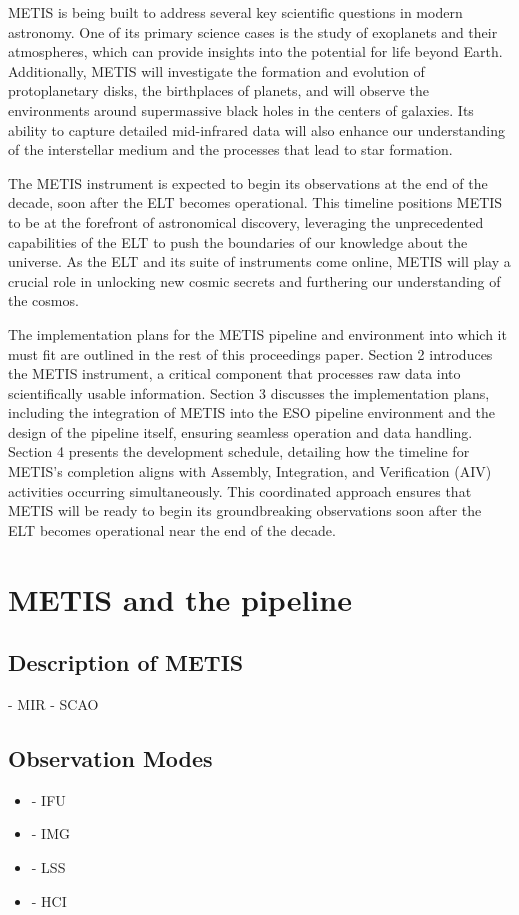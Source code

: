 \documentclass[a4paper]{spie}  %
\begin{document}
METIS is being built to address several key scientific questions in modern astronomy. One of its primary science cases is the study of exoplanets and their atmospheres, which can provide insights into the potential for life beyond Earth. Additionally, METIS will investigate the formation and evolution of protoplanetary disks, the birthplaces of planets, and will observe the environments around supermassive black holes in the centers of galaxies. Its ability to capture detailed mid-infrared data will also enhance our understanding of the interstellar medium and the processes that lead to star formation.

The METIS instrument is expected to begin its observations at the end of the decade, soon after the ELT becomes operational. This timeline positions METIS to be at the forefront of astronomical discovery, leveraging the unprecedented capabilities of the ELT to push the boundaries of our knowledge about the universe. As the ELT and its suite of instruments come online, METIS will play a crucial role in unlocking new cosmic secrets and furthering our understanding of the cosmos.

The implementation plans for the METIS pipeline and environment into which it must fit are outlined in the rest of this proceedings paper. Section 2 introduces the METIS instrument, a critical component that processes raw data into scientifically usable information. Section 3 discusses the implementation plans, including the integration of METIS into the ESO pipeline environment and the design of the pipeline itself, ensuring seamless operation and data handling. Section 4 presents the development schedule, detailing how the timeline for METIS's completion aligns with Assembly, Integration, and Verification (AIV) activities occurring simultaneously. This coordinated approach ensures that METIS will be ready to begin its groundbreaking observations soon after the ELT becomes operational near the end of the decade. 



\section{METIS and the pipeline}
\label{sec:environment}

\subsection{Description of METIS}
\label{ssec:env_metis}
	- MIR
	- SCAO
\subsection{Observation Modes}
\label{ssec:env_modes}
 \begin{itemize}
     \item - IFU
     \item - IMG
     \item - LSS
     \item - HCI
 \end{itemize}
 
\end{document}
